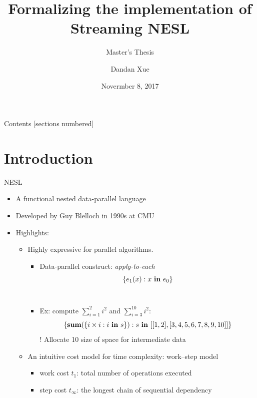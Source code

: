 \documentclass{beamer}
\title{Formalizing the implementation of \\ Streaming NESL}
\subtitle{Master's Thesis}
\author{Dandan Xue}
\date{Novermber 8, 2017}
\institute{Department of Computer Science (DIKU) \\ University of Copenhagen}
\begin{document}
\maketitle

\begin{frame}{Contents}
[sections numbered]
\tableofcontents[hideallsubsections]
\end{frame}


\section{Introduction}

\begin{frame}{NESL}

	\begin{itemize}
		\item A functional nested data-parallel language
		\item Developed by Guy Blelloch in 1990s at CMU
		\item Highlights: 
		\begin{itemize}
			\item Highly expressive for parallel algorithms. \\ 
			\begin{itemize}
			
			\item Data-parallel construct: \emph{apply-to-each} $$\{e_1(x) : x \ \mathbf{in} \ e_0 \} $$\\ 
	  \item Ex: compute $\sum_{i=1}^{2}i^2$ and $\sum_{i=3}^{10}i^2$:
	  $$\{\mathbf{sum}(\{i \times i: i \ \mathbf{in} \ s\}) : s \ \mathbf{in} \ [[1,2],[3,4,5,6,7,8,9,10]]\}$$
	  ! Allocate {\color{blue} 10} size of space for intermediate data
  		\end{itemize}
	  \item An intuitive cost model for time complexity: work--step model
	  \begin{itemize}
	  	\item work cost $t_1$: total number of operations executed
	  	\item step cost $t_\infty$: the longest chain of sequential dependency
	  \end{itemize}
	\end{itemize}
	\end{itemize}
  
\end{frame}
\end{document}
